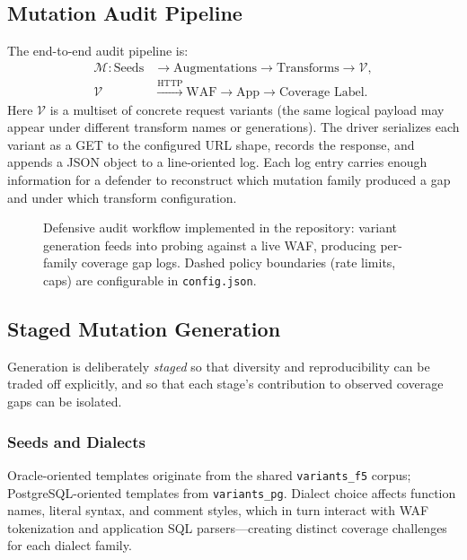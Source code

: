 \subsection{Mutation Audit Pipeline}
The end-to-end audit pipeline is:
\begin{equation}
\label{eq:audit-pipeline}
\begin{aligned}
\mathcal{M}: \text{Seeds} &\rightarrow \text{Augmentations} \rightarrow \text{Transforms} \rightarrow \mathcal{V}, \\
\mathcal{V} &\xrightarrow{\text{HTTP}} \text{WAF} \rightarrow \text{App} \rightarrow \text{Coverage Label}.
\end{aligned}
\end{equation}
Here $\mathcal{V}$ is a multiset of concrete request variants (the same logical payload may appear under different transform names or generations). The driver serializes each variant as a GET to the configured URL shape, records the response, and appends a JSON object to a line-oriented log. Each log entry carries enough information for a defender to reconstruct which mutation family produced a gap and under which transform configuration.

\begin{figure}[t]
  \centering
  \caption{Defensive audit workflow implemented in the repository: variant generation feeds into probing against a live WAF, producing per-family coverage gap logs. Dashed policy boundaries (rate limits, caps) are configurable in \texttt{config.json}.}
  \label{fig:pipeline}
\end{figure}

\subsection{Staged Mutation Generation}
Generation is deliberately \emph{staged} so that diversity and reproducibility can be traded off explicitly, and so that each stage's contribution to observed coverage gaps can be isolated.

\subsubsection{Seeds and Dialects}
Oracle-oriented templates originate from the shared \texttt{variants\_f5} corpus; PostgreSQL-oriented templates from \texttt{variants\_pg}. Dialect choice affects function names, literal syntax, and comment styles, which in turn interact with WAF tokenization and application SQL parsers---creating distinct coverage challenges for each dialect family.

